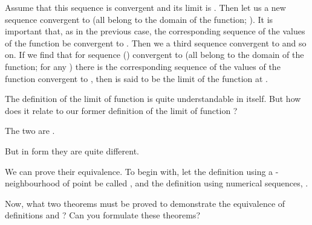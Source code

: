 \begin{p}
Assume that this sequence is convergent and its limit is . Then let us  a new sequence convergent to 
(all  belong to the domain of the function; ). It is important that, as in the previous case, the corresponding sequence of the values of the function
be convergent to . Then we  a third sequence convergent to 
and so on. If we find that for  sequence () convergent to  (all  belong to the domain of the function;  for any ) there is the corresponding sequence of the values of the function convergent to , then  is said to be the limit of the function  at .
\end{p}

\begin{s}
The definition of the limit of function is quite understandable in itself. But how does it relate to our former definition of the limit of function ?
\end{s}

\begin{p}
The two are . 
\end{p}

\begin{s}
But in form they are quite different.
\end{s}

\begin{p}
We can prove their equivalence. To begin with, let the definition using a \hlm{$\delta$}-neighbourhood of point  be called , and the definition using numerical sequences, . 

Now, what two theorems must be proved to demonstrate the equivalence of definitions  and ? Can you formulate these theorems?
\end{p}

